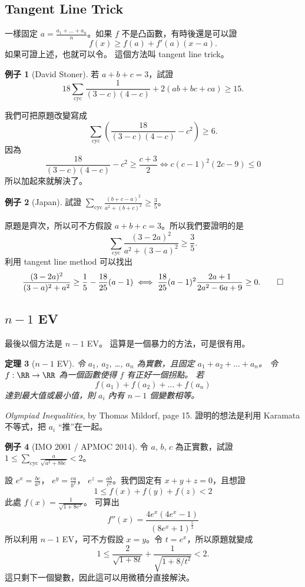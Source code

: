 \documentclass[11pt,nothm]{scrartcl}
\newtheorem{theorem}{\color{blue!40!black}定理}
\theoremstyle{definition}
\newtheorem{example}[theorem]{\color{blue!40!black}例子}
\let\oldendproof\endproof
\renewenvironment{proof}[1][【證】]{%
  \oldproof[\bfseries #1\nopunct]%
}{\oldendproof}
\begin{document}
\subsection{Tangent Line Trick}
一樣固定 $a = \frac{a_1 + \dots + a_n}{n}$。如果 $f$ 不是凸函數，有時後還是可以證
\[ f(x) \ge f(a) + f'(a) \left( x-a \right). \]
如果可證上述，也就可以令。 這個方法叫 tangent line trick。

\begin{example}
  [David Stoner] 若 $a+b+c=3$，試證 \[ 18\sum_{\text{cyc}}\frac{1}{(3-c)(4-c)}+2(ab+bc+ca)\ge 15. \]
\end{example}
\begin{proof}
  我們可把原題改變寫成
  \[ \sum_{\text{cyc}} \left( \frac{18}{(3-c)(4-c)} - c^2 \right) \ge 6. \]
  因為
  \[ \frac{18}{(3-c)(4-c)} -c^2 \ge \frac{c+3}{2}\iff c(c-1)^2(2c-9)\le 0 \]
  所以加起來就解決了。
\end{proof}
\begin{example}
  [Japan] 試證 $\sum_{\text{cyc}} \frac{(b+c-a)^2}{a^2+(b+c)^2} \ge \frac 35$。
\end{example}
\begin{proof}
  原題是齊次，所以可不方假設 $a+b+c=3$。所以我們要證明的是
  \[ \sum_{\text{cyc}} \frac{(3-2a)^2}{a^2+(3-a)^2} \ge \frac 35. \]
  利用 tangent line method 可以找出
  \[
    \frac{(3-2a)^{2}}{(3-a)^{2}+a^{2}}\ge\frac{1}{5} - \frac{18}{25}(a-1)
    \iff
    \frac{18}{25}(a-1)^{2}\frac{2a+1}{2a^{2}-6a+9}
    \ge 0. \qedhere \]
\end{proof}

\subsection{$n-1$ EV}
最後以個方法是 $n-1$ EV。
這算是一個暴力的方法，可是很有用。
\begin{theorem}
  [$n-1$ EV] 令 $a_1$, $a_2$, \dots, $a_n$ 為實數，且固定 $a_1 + a_2 + \dots + a_n$。
  令 $f : \RR \to \RR$ 為一個函數使得 $f$ 有正好一個拐點。
  若
  \[ f(a_1) + f(a_2) + \dots + f(a_n) \]
  達到最大值或最小值，則 $a_i$ 內有 $n-1$ 個變數相等。
\end{theorem}
\begin{proof}
  \emph{Olympiad Inequalities}, by Thomas Mildorf, page 15.
  證明的想法是利用 Karamata 不等式，把 $a_i$ “推”在一起。
\end{proof}

\begin{example}
  [IMO 2001 / APMOC 2014] 令 $a$, $b$, $c$ 為正實數，試證
  $ 1 \le \sum_{\text{cyc}} \frac{a}{\sqrt{a^2+8bc}} < 2 $。
\end{example}
\begin{proof}
  設 $e^x = \frac{bc}{a^2}$， $e^y = \frac{ca}{b^2}$， $e^z = \frac{ab}{c^2}$。我們固定有 $x+y+z=0$，且想證
  \[ 1 \le f(x) + f(y) + f(z) < 2 \]
  此處 $f(x) = \frac{1}{\sqrt{1+8e^x}}$。 可算出
  \[ f''(x) = \frac{4e^x \left( 4e^x-1 \right)}{(8e^x+1)^{\frac52}} \]
  所以利用 $n-1$ EV，可不方假設 $x=y$。令 $t=e^x$，所以原題就變成
  \[ 1 \le \frac{2}{\sqrt{1+8t}} + \frac{1}{\sqrt{1+8/t^2}} < 2. \]
  這只剩下一個變數，因此這可以用微積分直接解決。
\end{proof}
\end{document}
